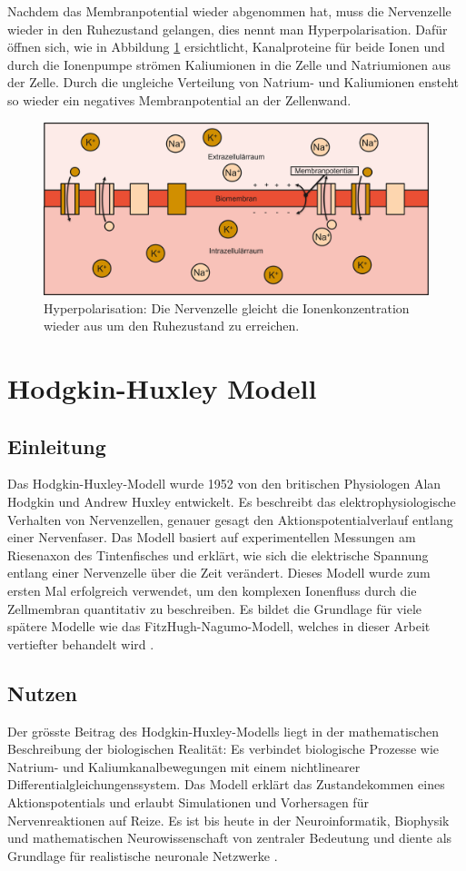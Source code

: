 \begin{refsection}
Nachdem das Membranpotential wieder abgenommen hat, muss die Nervenzelle wieder in den Ruhezustand gelangen, dies nennt
man Hyperpolarisation.
Dafür öffnen sich, wie in Abbildung \ref{fig:Hyperpolarisation} ersichtlicht, Kanalproteine für beide Ionen und durch die
Ionenpumpe strömen Kaliumionen in die Zelle und Natriumionen aus der Zelle.
Durch die ungleiche Verteilung von Natrium- und Kaliumionen ensteht so wieder ein negatives Membranpotential an der Zellenwand.
\begin{figure}[h]
    \centering
    \includegraphics[width=\textwidth]{papers/nerven/Bilder/Vorgang5.png}
    \caption{Hyperpolarisation: Die Nervenzelle gleicht die Ionenkonzentration wieder aus um den Ruhezustand zu erreichen.}
    \label{fig:Hyperpolarisation}
\end{figure}
\section{Hodgkin-Huxley Modell}
\subsection{Einleitung}
Das Hodgkin-Huxley-Modell wurde 1952 von den britischen Physiologen Alan Hodgkin und Andrew Huxley entwickelt. Es beschreibt das elektrophysiologische Verhalten von Nervenzellen, genauer gesagt den Aktionspotentialverlauf entlang einer Nervenfaser. Das Modell basiert auf experimentellen Messungen am Riesenaxon des Tintenfisches und erklärt, wie sich die elektrische Spannung entlang einer Nervenzelle über die Zeit verändert. Dieses Modell wurde zum ersten Mal erfolgreich verwendet, um den komplexen Ionenfluss durch die Zellmembran quantitativ zu beschreiben. Es bildet die Grundlage für viele spätere Modelle wie das FitzHugh-Nagumo-Modell, welches in dieser Arbeit vertiefter behandelt wird 
\cite{nerven:InaLammers.31.08.2015}.
\subsection{Nutzen}
Der grösste Beitrag des Hodgkin-Huxley-Modells liegt in der mathematischen Beschreibung der biologischen Realität: Es verbindet biologische Prozesse wie Natrium- und Kaliumkanalbewegungen mit einem nichtlinearer Differentialgleichungenssystem. Das Modell erklärt das Zustandekommen eines Aktionspotentials und erlaubt Simulationen und Vorhersagen für Nervenreaktionen auf Reize. Es ist bis heute in der Neuroinformatik, Biophysik und mathematischen Neurowissenschaft von zentraler Bedeutung und diente als Grundlage für realistische neuronale Netzwerke 
\cite{nerven:InaLammers.31.08.2015}.

\end{refsection}
